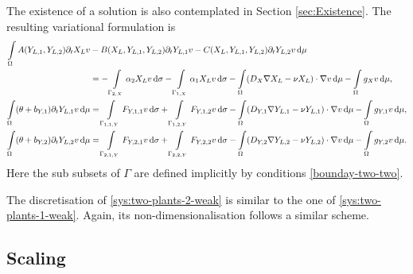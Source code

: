 \documentclass[11pt]{article}
\begin{document}
The existence of a solution is also contemplated in Section \ref{sec:Existence}.
The resulting variational formulation is 
\begin{subequations}
\label{sys:two-plants-2-weak}
\begin{align}
    \int\limits_\Omega
    A(Y_{L,1}, Y_{L,2}) \partial_t X_L v &- B(X_L, Y_{L,1}, Y_{L,2}) \partial_t Y_{L,1} v - C(X_L, Y_{L,1}, Y_{L,2}) \partial_t Y_{L,2} v \dif \mu 
    \notag
    \\
    &=
    - \int\limits_{\Gamma_{2,X}}  \alpha_2 X_L v \dif \sigma
    - \int\limits_{\Gamma_{1,X}} \alpha_1 X_L v \dif \sigma
    -\int\limits_\Omega
    (D_X \nabla X_L - \nu X_L) \cdot \nabla v  \dif \mu
    -\int\limits_\Omega g_X v \dif \mu,
    \\
    \int\limits_\Omega (\theta + b_{Y,1}) \partial_t Y_{L,1} v \dif \mu  &=
    \int\limits_{\Gamma_{1,1,Y}} F_{Y,1,1} v \dif\sigma
    + \int\limits_{\Gamma_{1,2,Y}} F_{Y,1,2} v \dif\sigma
    -\int\limits_\Omega (D_{Y,1} \nabla Y_{L,1} - \nu Y_{L,1}) \cdot \nabla v \dif\mu - \int\limits_\Omega g_{Y,1} v \dif\mu,
    \\
    \int\limits_\Omega (\theta + b_{Y,2}) \partial_t Y_{L,2} v \dif\mu  &=
    \int\limits_{\Gamma_{2,1,Y}} F_{Y,2,1} v \dif\sigma
    +\int\limits_{\Gamma_{2,2,Y}} F_{Y,2,2} v \dif\sigma - 
    \int\limits_\Omega (D_{Y,2} \nabla Y_{L,2} - \nu Y_{L,2}) \cdot \nabla v \dif\mu - \int\limits_\Omega g_{Y,2} v \dif\mu.
\end{align}
\end{subequations}
Here the sub subsets of \(\Gamma\) are defined implicitly by conditions \eqref{bounday-two-two}.

The discretisation of \eqref{sys:two-plants-2-weak} is similar to the one of \eqref{sys:two-plants-1-weak}. Again, its non-dimensionalisation follows a similar scheme.








\subsection{Scaling}
\end{document}
